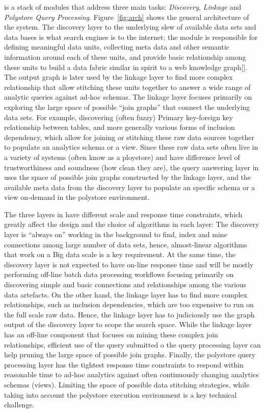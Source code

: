 \dcv is a stack of modules that address three main tasks: {\em Discovery}, 
{\em Linkage} and  {\em Polystore Query Processing}. Figure~\ref{fig:arch} shows the general architecture of the \dcv system. The discovery layer to the underlying slew of available data sets and data bases is what search engines is to the internet; the module is responsible for defining meaningful data units, collecting meta data and other semantic information around each of these units, and provide basic relationship among these units to build a data fabric similar in spirit to a web knowledge graph[]. The output graph is later used by the linkage layer to find more complex relationship that allow stitching these units together to answer a wide range of analytic queries against ad-hoc schemas. The linkage layer focuses primarily on exploring the large space of possible ``join graphs'' that connect the underlying data sets. For example, discovering (often fuzzy) Primary key-foreign key relationship between tables, and more generally various forms of inclusion dependency, which allow for joining or stitching these raw data sources together to populate an analytics schema or a view. Since these raw data sets often live in a variety of systems (often know as a ploystore) and have difference level of trustworthiness and soundness (how clean they are), the query answering layer in \dcv uses the space of possible join graphs constructed by the linkage layer, and the available meta data from the discovery layer to populate an specific schema or a view on-demand in the polystore environment.   


The three layers in \dcv have different scale and response time constraints, which greatly affect the design and the choice of algorithms in each layer: The discovery layer is ``always on'' working in the background to find, index and mine connections among large number of data sets, hence, almost-linear algorithms that work on a Big data scale is a key requirement. At the same time, the discovery layer is not expected to have on-line response time and will be mostly performing off-line batch data processing workflows focusing primarily on discovering simple and basic connections and relationships among the various data artefacts. On the other hand, the linkage layer has to find more complex relationships, such as inclusion dependencies, which are too expensive to run on the full scale raw data. Hence, the linkage layer has to judiciously use the graph output of the discovery layer to scope the search space. While the linkage layer has an off-line component that focuses on mining these complex join relationships, efficient use of the query submitted o the query processing layer can help pruning the large space of possible join graphs. Finally, the polystore query processing layer has the tightest response time constraints to respond within reasonable time to ad-hoc analytics against often continuously changing analytics schemas (views). Limiting the space of possible data stitching strategies, while taking into account the polystore execution environment is a key technical challenge. 


